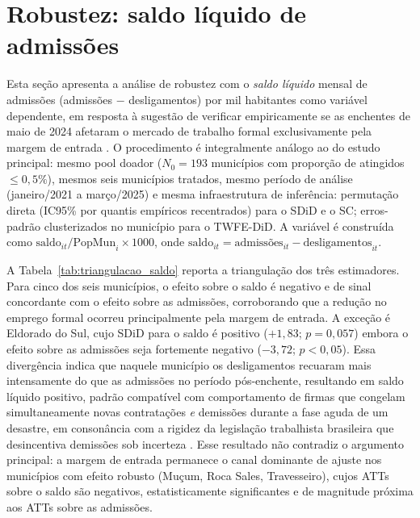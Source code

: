 \documentclass[a4paper,12pt]{article}
\begin{document}
\clearpage
\appendix
\renewcommand{\thesection}{Apêndice~\Alph{section}}

\section{Robustez: saldo líquido de admissões}
\label{apx:saldo}

Esta seção apresenta a análise de robustez com o \emph{saldo líquido} mensal de admissões
(admissões $-$ desligamentos) por mil habitantes como variável dependente, em resposta à
sugestão de verificar empiricamente se as enchentes de maio de 2024 afetaram o mercado de
trabalho formal exclusivamente pela margem de entrada \cite{teixeira2024}. O
procedimento é integralmente análogo ao do estudo principal: mesmo pool doador
($N_0 = 193$ municípios com proporção de atingidos $\leq 0{,}5\%$), mesmos seis
municípios tratados, mesmo período de análise (janeiro/2021 a março/2025) e
mesma infraestrutura de inferência: permutação direta (IC95\% por quantis empíricos
recentrados) para o SDiD e o SC; erros-padrão clusterizados no município para o
TWFE-DiD. A variável é construída como $\text{saldo}_{it}/\text{PopMun}_i \times 1000$,
onde $\text{saldo}_{it} = \text{admissões}_{it} - \text{desligamentos}_{it}$.

A Tabela~\ref{tab:triangulacao_saldo} reporta a triangulação dos três estimadores.
Para cinco dos seis municípios, o efeito sobre o saldo é negativo e de sinal
concordante com o efeito sobre as admissões, corroborando que a redução no
emprego formal ocorreu principalmente pela margem de entrada. A exceção é
Eldorado do Sul, cujo SDiD para o saldo é positivo ($+1{,}83$; $p = 0{,}057$)
embora o efeito sobre as admissões seja fortemente negativo ($-3{,}72$; $p < 0{,}05$).
Essa divergência indica que naquele município os desligamentos recuaram mais intensamente
do que as admissões no período pós-enchente, resultando em saldo líquido positivo,
padrão compatível com comportamento de firmas que congelam simultaneamente novas
contratações \emph{e} demissões durante a fase aguda de um desastre, em consonância
com a rigidez da legislação trabalhista brasileira que desincentiva demissões sob
incerteza \cite{teixeira2024, krein2012}. Esse resultado não contradiz o argumento principal:
a margem de entrada permanece o canal dominante de ajuste nos municípios com efeito
robusto (Muçum, Roca Sales, Travesseiro), cujos ATTs sobre o saldo são negativos,
estatisticamente significantes e de magnitude próxima aos ATTs sobre as admissões.
\end{document}
